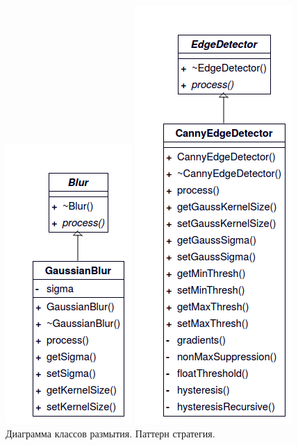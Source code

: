 \begin{figure}[H]
	\centering
	\begin{minipage}{.33\textwidth}
		\centering
		\includegraphics[scale=0.65]{classes/blur.png}
		\caption{Диаграмма классов размытия. Паттерн стратегия.}
		\label{class:blur}
	\end{minipage}%
	\begin{minipage}{.33\textwidth}
		\centering
		\includegraphics[scale=0.65]{classes/edgedetector.png}

\end{minipage}
\end{figure}

